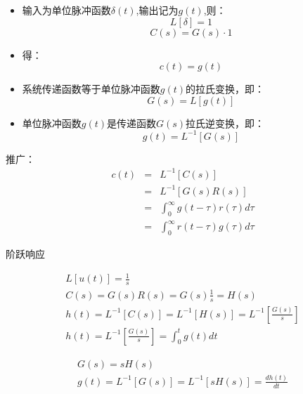  \begin{frame}
 \begin{block}{}
 \begin{itemize}
 \item<+-> 输入为单位脉冲函数$\delta(t)$,输出记为$g(t)$,则：
 \[L[\delta]=1\]
 \[C(s)=G(s)\cdot 1\]
 \item<+-> 得：
 \[c(t)=g(t)\]
\end{itemize}  
\end{block}
\end{frame}

\begin{frame}
\begin{block}{}
\begin{itemize}
\item<+-> 系统传递函数等于单位脉冲函数$g(t)$的拉氏变换，即：
\[G(s)=L[g(t)]\]
\item<+-> 单位脉冲函数$g(t)$是传递函数$G(s)$拉氏逆变换，即：
\[g(t)=L^{-1}[G(s)]\]
\end{itemize}
\end{block}
\end{frame}
\begin{frame}
\begin{block}{}
推广：
\begin{eqnarray*}
c(t)&=&L^{-1}[C(s)]\\
&=&L^{-1}[G(s)R(s)]\\
&=&\int^{\infty}_{0}g(t-\tau)r(\tau)d\tau \\
&=&\int^{\infty}_{0}r(t-\tau)g(\tau)d\tau
\end{eqnarray*}
\end{block}
\end{frame}
\begin{frame}{阶跃响应}
\begin{block}{}
\begin{eqnarray*}
L[u(t)]=\frac{1}{s}\\
C(s)=G(s)R(s)=G(s)\frac{1}{s}=H(s)\\
h(t)=L^{-1}[C(s)]=L^{-1}[H(s)]=L^{-1}[\frac{G(s)}{s}]\\
h(t)=L^{-1}[\frac{G(s)}{s}]=\int^t_0g(t)dt
\end{eqnarray*}
\end{block}
\end{frame}
\begin{frame}
\begin{block}{}
\begin{eqnarray*}
G(s)=sH(s)\\
g(t)=L^{-1}[G(s)]=L^{-1}[sH(s)]=\frac{dh(t)}{dt}
\end{eqnarray*}
\end{block}
\end{frame}
